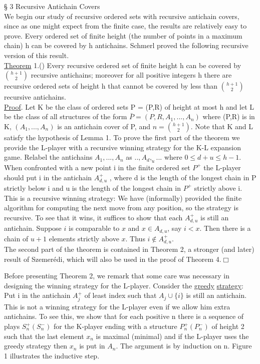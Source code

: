 \documentclass[twoside]{article}
\begin{document}
\noindent\S \hspace{1pt} 3 Recursive Antichain Covers\\
\newline
\indent We begin our study of recursive ordered sets with recursive antichain covers, since as one might expect from the finite case,  the results are relatively easy to prove.   
Every ordered set of finite height (the number of points in a maximum chain) h   can be covered by   h   antichains. 
Schmerl proved the following recursive version of this result.\\
\newline
\underline{Theorem} 1.(\cite{Schmerl79})   Every recursive ordered set of finite height h can be covered by $\binom{h+1}{2}$  recursive antichains; moreover for all positive integers   h there are recursive ordered sets of height   h   that cannot be covered by less than $\binom{h+1}{2}$ recursive antichains.\\
\newline
\underline{Proof}. Let K be the class of ordered sets P = (P,R) of height at most h and let L be the class of all structures of the form $\bar{P} = (P,R,A_1,...,A_n)$ where (P,R) is in K, $(A_1,...,A_n)$ is an antichain cover of P, and $n = \binom{h+1}{2}$. Note that K and L satisfy the hypothesis of Lemma 1. 
To prove the first part of the theorem we provide the L-player with a recursive winning strategy for the K-L expansion game. Relabel the antichains $A_1,...,A_n$ as $..,A_d,_u...$ where $0 \leq d+u \leq h-1$.   
When confronted with a new point i in the
finite ordered set $P^+$ the L-player should put i in the antichain $A_{d,u}^+$   , where d  is the length of the longest chain in P   strictly below i and u is the
length of the longest chain in $P^+$ strictly above i.   This is a recursive
winning strategy: We have (informally) provided the finite algorithm for
computing the next move from any position, so the strategy is recursive. To
see that it wins, it suffices to show that each $A_{d,u}^+$  is still an antichain.
Suppose $i$ is comparable to $x$ and $x \in A_{d,u}$, say $i < x$. Then there is a chain of $u + 1$ elements strictly above $x$. Thus $i \not \in A_{d,u}^+$.\\
\indent The second part of the theorem is contained in Theorem 2, a stronger (and later) result of Szemer\'{e}di, which will also be used in the proof of Theorem 4.$\Box$

\newpage
%
%


Before presenting Theorem 2, we remark that some care was necessary in designing the winning strategy for the   L-player.   Consider the \underline{greedy} \underline{strategy}:    Put    i    in the antichain  $A_j^+$   of least index such that   $A_j \cup  \{i\}$ is    still an antichain.    
This is not a winning strategy for the   L-player even if we allow him extra antichains.    
To see this, we show that for each positive n    there is a sequence of plays $S_n^+  (S_n^-)$   for the   K-player ending with a
structure $P_n^+  (P_n^-)$   of height   2   such that the last element $x_n$    is maximal
(minimal) and if the   L-player uses the greedy strategy then $x_n$   is put in $A_n$.   The argument is by induction on   n.    Figure 1 illustrates the inductive step.
\end{document}
